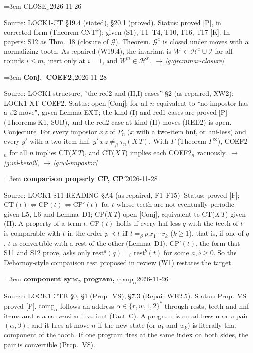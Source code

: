 \documentclass[11pt]{amsart}
\makeatletter
\newcommand{\conv}{=_\beta}
\newcommand{\rest}{\mathrm{rest}}
\newcommand{\Hc}{\mathcal H}
\newcommand{\Ic}{\mathcal I}
\newcommand{\Gc}{\mathcal G}
\newcounter{sense}
\newenvironment{entry}[3]{%
  \par\addvspace{\medskipamount}\noindent\phantomsection
  \def\@currentlabel{#2}\label{#1}\setcounter{sense}{0}\raggedright\emergencystretch=3em%
  \textbf{#2}\hfill{\footnotesize\textsf{#3}}\par\nopagebreak\noindent\ignorespaces}%
  {\par}
\newcommand{\src}[1]{\textsf{Source:} #1.\enskip}
\newcommand{\status}[1]{\textsf{Status:} #1.\enskip}
\newcommand{\appears}[1]{\textsf{In papers:} #1.\enskip}
\renewcommand{\see}[1]{$\rightarrow$\,\emph{\ref{#1}}}
\makeatother
\begin{document}
\begin{entry}{g:wl-close-x}{$\mathrm{CLOSE}_x$}{2026-11-26}
\src{LOCK1-CT \S19.4 (stated), \S20.1 (proved)}
\status{proved [P], in corrected form (Theorem CNT$^{x}$); given (S1), T1--T4, T10, T16, T17 [K]}
\appears{S12 as Thm.~18 (closure of $\Gc$)}
Theorem. $\Gc^{x}$ is closed under moves with a normalizing tooth. As repaired (W19.4), the invariant
is $W^i\in\Hc^{x}\cup\Ic$ for all rounds $i\le m$, inert only at $i=1$, and $W^m\in\Hc^{x}$.
\see{g:grammar-closure}
\end{entry}

\begin{entry}{g:wl-coef2}{Conj.~COEF2$_n$}{2026-11-28}
\src{LOCK1-structure, ``the red2 and (II,I) cases'' \S2 (as repaired, XW2); LOCK1-XT-COEF2}
\status{open [Conj]; for all $n$ equivalent to ``no impostor has a $\beta2$ move'', given Lemma EXT; the
kind-(I) and red1 cases are proved [P] (Theorems K1, SUB), and the red2 case at kind-(II) moves (RED2) is
open}
Conjecture. For every impostor $x\,z$ of $P_n$ ($x$ with a two-item hnf, or hnf-less) and every $y'$ with
a two-item hnf, $y'\,x\,z\not\conv\tau_n(X\,T)$. With $\Gamma$ (Theorem $\Gamma^\infty$), COEF2$_n$ for all $n$
implies CT($X\,T$), and CT($X\,T$) implies each COEF2$_n$ vacuously. \see{g:wl-beta2}, \see{g:wl-impostor}
\end{entry}

\begin{entry}{g:wl-cp}{comparison property CP, CP$'$}{2026-11-28}
\src{LOCK1-S11-READING \S A4 (as repaired, F1--F15)}
\status{proved [P]; CT$(t)\Leftrightarrow{}$CP$(t)\Leftrightarrow{}$CP$'(t)$ for $t$ whose teeth are not
eventually periodic, given L5, L6 and Lemma~D1; CP($X\,T$) open [Conj], equivalent to CT($X\,T$) given (H)}
A property of a term $t$: CP$(t)$ holds if every hnf-less $q$ with the teeth of $t$ is comparable with
$t$ in the order $p\prec t$ iff $t\conv p\,x_1\cdots x_k$ ($k\ge1$), that is, if one of $q$, $t$ is
convertible with a rest of the other (Lemma~D1). CP$'(t)$, the form that S11 and S12 prove, asks only
$\rest^a(q)\conv\rest^b(t)$ for some $a,b\ge0$. So the Dehornoy-style comparison test proposed in
review (W1) restates the target.
\end{entry}

\begin{entry}{g:wl-program}{component sync, program, $\mathrm{comp}_\alpha$}{2026-11-26}
\src{LOCK1-CTB \S0, \S1 (Prop.~VS), \S7.3 (Repair WB2.5)}
\status{Prop.~VS proved [P]}
$\mathrm{comp}_\alpha$ follows an address $\alpha\in\{r,w,1,2\}^*$ through rests, teeth and hnf items and
is a conversion invariant (Fact~C). A program is an address $\alpha$ or a pair $(\alpha,\beta)$, and it
fires at move $n$ if the new state (or $a_k$ and $w_k$) is literally that component of the tooth. If
one program fires at the same index on both sides, the pair is convertible (Prop.~VS).
\end{entry}
\end{document}

